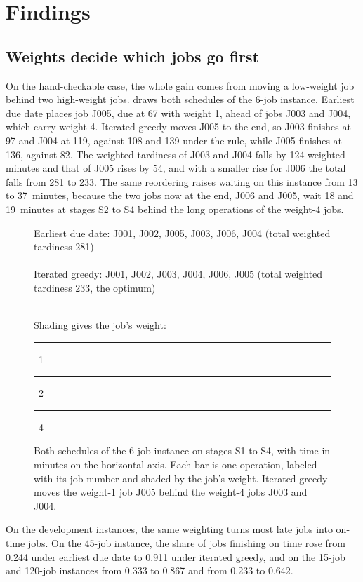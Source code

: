 \section{Findings}\label{sec:findings}

\subsection{Weights decide which jobs go first}\label{sec:weights}

\sumpara On the hand-checkable case, the whole gain comes from moving a low-weight job behind two high-weight jobs. \sumparaend
\fin {} draws both schedules of the 6-job instance. \fine
\fin Earliest due date places job J005, due at 67 with weight 1, ahead of jobs J003 and J004, which carry weight 4. \fine
\fin Iterated greedy moves J005 to the end, so J003 finishes at 97 and J004 at 119, against 108 and 139 under the rule, while J005 finishes at 136, against 82. \fine
\fin The weighted tardiness of J003 and J004 falls by 124 weighted minutes and that of J005 rises by 54, and with a smaller rise for J006 the total falls from 281 to 233. \fine
\fin The same reordering raises waiting on this instance from 13 to 37~minutes, because the two jobs now at the end, J006 and J005, wait 18 and 19~minutes at stages S2 to S4 behind the long operations of the weight-4 jobs. \fine

\begin{figure}[ht]
\centering
{\footnotesize\color{muted}Earliest due date: J001, J002, J005, J003, J006, J004 (total weighted tardiness 281)}\\[2pt]
\gantt{\eddschedule}\\[6pt]
{\footnotesize\color{muted}Iterated greedy: J001, J002, J003, J004, J006, J005 (total weighted tardiness 233, the optimum)}\\[2pt]
\gantt{\igschedule}\\[4pt]
{\footnotesize\color{muted}Shading gives the job's weight:
\textcolor{w1}{\rule{0.7em}{0.7em}}~1\quad
\textcolor{w2}{\rule{0.7em}{0.7em}}~2\quad
\textcolor{w4}{\rule{0.7em}{0.7em}}~4}
\caption{Both schedules of the 6-job instance on stages S1 to S4, with time in minutes on the horizontal axis. Each bar is one operation, labeled with its job number and shaded by the job's weight. Iterated greedy moves the weight-1 job J005 behind the weight-4 jobs J003 and J004.}
\label{fig:gantt}
\end{figure}

\sumpara On the development instances, the same weighting turns most late jobs into on-time jobs. \sumparaend
\fin On the 45-job instance, the share of jobs finishing on time rose from 0.244 under earliest due date to 0.911 under iterated greedy, and on the 15-job and 120-job instances from 0.333 to 0.867 and from 0.233 to 0.642. \fine

